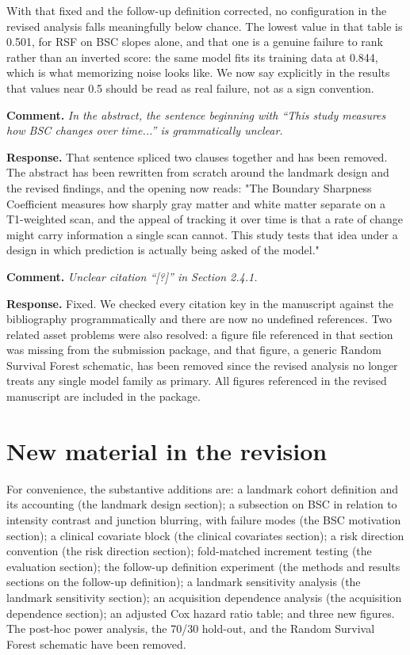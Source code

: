 \documentclass[11pt]{article}
\newcommand{\comment}[1]{\vspace{6pt}\noindent\textbf{Comment.} \textit{#1}\par\vspace{2pt}}
\newcommand{\response}{\noindent\textbf{Response.} }
\begin{document}
With that fixed and the follow-up definition corrected, no configuration in the revised analysis falls meaningfully below chance. The lowest value in that table is 0.501, for RSF on BSC slopes alone, and that one is a genuine failure to rank rather than an inverted score: the same model fits its training data at 0.844, which is what memorizing noise looks like. We now say explicitly in the results that values near 0.5 should be read as real failure, not as a sign convention.

\comment{In the abstract, the sentence beginning with ``This study measures how BSC changes over time...'' is grammatically unclear.}

\response That sentence spliced two clauses together and has been removed. The abstract has been rewritten from scratch around the landmark design and the revised findings, and the opening now reads: "The Boundary Sharpness Coefficient measures how sharply gray matter and white matter separate on a T1-weighted scan, and the appeal of tracking it over time is that a rate of change might carry information a single scan cannot. This study tests that idea under a design in which prediction is actually being asked of the model."

\comment{Unclear citation ``[?]'' in Section 2.4.1.}

\response Fixed. We checked every citation key in the manuscript against the bibliography programmatically and there are now no undefined references. Two related asset problems were also resolved: a figure file referenced in that section was missing from the submission package, and that figure, a generic Random Survival Forest schematic, has been removed since the revised analysis no longer treats any single model family as primary. All figures referenced in the revised manuscript are included in the package.

\section*{New material in the revision}

For convenience, the substantive additions are: a landmark cohort definition and its accounting (the landmark design section); a subsection on BSC in relation to intensity contrast and junction blurring, with failure modes (the BSC motivation section); a clinical covariate block (the clinical covariates section); a risk direction convention (the risk direction section); fold-matched increment testing (the evaluation section); the follow-up definition experiment (the methods and results sections on the follow-up definition); a landmark sensitivity analysis (the landmark sensitivity section); an acquisition dependence analysis (the acquisition dependence section); an adjusted Cox hazard ratio table; and three new figures. The post-hoc power analysis, the 70/30 hold-out, and the Random Survival Forest schematic have been removed.
\end{document}
